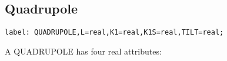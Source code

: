 






\subsection{Quadrupole}
\begin{verbatim}
label: QUADRUPOLE,L=real,K1=real,K1S=real,TILT=real;
\end{verbatim}     A QUADRUPOLE has four real attributes:     

